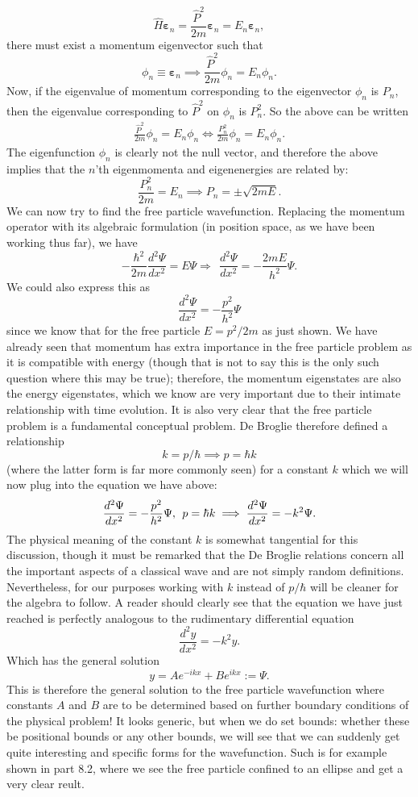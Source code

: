$$
\hat{H}\bm{\varepsilon}_{n}=\frac{\hat{P}^2}{2m}\bm{\varepsilon}_{n}=E_{n}\bm{\varepsilon}_{n}, 
$$
there must exist a momentum eigenvector such that
$$
\phi_{n}\equiv\bm{\varepsilon}_{n}\implies \frac{\hat{P}^2}{2m}\phi_{n}=E_{n}\phi_{n}.
$$
Now, if the eigenvalue of momentum corresponding to the eigenvector $\phi_{n}$ is $P_{n}$, then the eigenvalue corresponding to $\hat{P}^2$ on $\phi_{n}$ is $P_{n}^{2}$. So the above can be written
$$
\begin{aligned}
\frac{\hat{P}^2}{2m}\phi_{n}=E_{n}\phi_{n}\iff\frac{P_{n}^{2}}{2m}\phi_{n}=E_{n}\phi_{n}.
\end{aligned}
$$
The eigenfunction $\phi_{n}$ is clearly not the null vector, and therefore the above implies that the $n$'th eigenmomenta and eigenenergies are related by:
$$
\frac{P_{n}^{2}}{2m}=E_{n}\implies P_{n}=\pm\sqrt{2mE}.
$$
We can now try to find the free particle wavefunction. Replacing the momentum operator with its algebraic formulation (in position space, as we have been working thus far), we have
$$
-{\frac{\hbar^2}{2m}}\frac{d^2\Psi}{dx^2} = E\Psi \Rightarrow\:\: \frac{d^2\Psi}{dx^2} =-{\frac{2mE}{h^2}}\Psi.
$$
We could also express this as 
$$
\frac{d^2\Psi}{dx^2} =-{\frac{p^2}{h^2}}\Psi
$$
since we know that for the free particle $E=p^2/2m$ as just shown. We have already seen that momentum has extra importance in the free particle problem as it is compatible with energy (though that is not to say this is the only such question where this may be true); therefore, the momentum eigenstates are also the energy eigenstates, which we know are very important due to their intimate relationship with time evolution. It is also very clear that the free particle problem is a fundamental conceptual problem. De Broglie therefore defined a relationship
$$
k=p/\hbar \implies p = \hbar k
$$
(where the latter form is far more commonly seen) for a constant $k$ which we will now plug into the equation we have above:
$$
\frac{d^2\Psi}{dx^2} =-{\frac{p^2}{h^2}}\Psi, \:\: p=\hbar k \implies \frac{d^2\Psi}{dx^2} =-k^2\Psi.
$$
The physical meaning of the constant $k$ is somewhat tangential for this discussion, though it must be remarked that the De Broglie relations concern all the important aspects of a classical wave and are not simply random definitions. Nevertheless, for our purposes working with $k$ instead of $p/\hbar$ will be cleaner for the algebra to follow. A reader should clearly see that the equation we have just reached is perfectly analogous to the rudimentary differential equation 
$$
\frac{d^2y}{dx^2}=-k^2y.
$$
Which has the general solution
$$
y=Ae^{-ikx}+Be^{ikx}:=\Psi.
$$
This is therefore the general solution to the free particle wavefunction where constants $A$ and $B$ are to be determined based on further boundary conditions of the physical problem! It looks generic, but when we do set bounds: whether these be positional bounds or any other bounds, we will see that we can suddenly get quite interesting and specific forms for the wavefunction. Such is for example shown in part 8.2, where we see the free particle confined to an ellipse and get a very clear reult.
